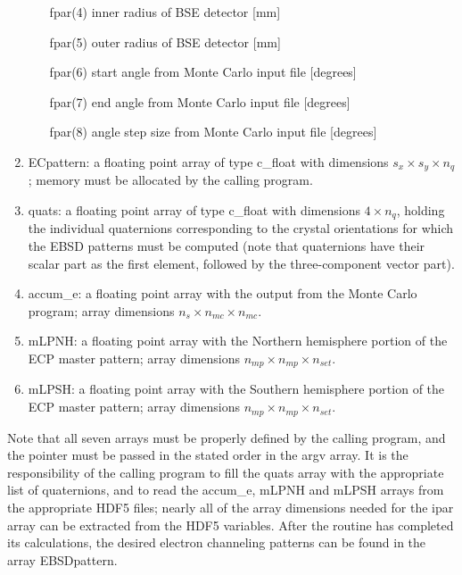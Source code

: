 \documentclass[DIV=calc, paper=letter, fontsize=11pt]{scrartcl}	 %
\begin{document}
\begin{enumerate}
\begin{enumerate}
		\item[\textsf{fpar}(4)] inner radius of BSE detector [mm]
		\item[\textsf{fpar}(5)] outer radius of BSE detector [mm]
		\item[\textsf{fpar}(6)] start angle from Monte Carlo input file [degrees]
		\item[\textsf{fpar}(7)] end angle from Monte Carlo input file [degrees]
		\item[\textsf{fpar}(8)] angle step size from Monte Carlo input file [degrees]
	\end{enumerate}
	\item \textsf{ECpattern}: a floating point array of type \textsf{c\_float} with dimensions $s_x\times s_y\times n_q$; memory must be allocated by the calling program.
	\item \textsf{quats}: a floating point array of type \textsf{c\_float} with dimensions $4\times n_q$, holding the individual quaternions corresponding to the crystal
	orientations for which the EBSD patterns must be computed (note that quaternions have their scalar part as the first element, followed by the three-component vector part).
	\item \textsf{accum\_e}: a floating point array with the output from the Monte Carlo program; array dimensions $n_{s}\times n_{mc}\times n_{mc}$.
	\item \textsf{mLPNH}: a floating point array with the Northern hemisphere portion of the ECP master pattern; array dimensions $n_{mp}\times n_{mp}\times n_{set}$.
	\item \textsf{mLPSH}: a floating point array with the Southern hemisphere portion of the ECP master pattern; array dimensions $n_{mp}\times n_{mp}\times n_{set}$.
\end{enumerate}
Note that all seven arrays must be properly defined by the calling program, and the pointer must be passed in the stated order in the \textsf{argv} array.   It is 
the responsibility of the calling program to fill the \textsf{quats} array with the appropriate list of quaternions, and to read the \textsf{accum\_e}, \textsf{mLPNH} and
\textsf{mLPSH} arrays from the appropriate HDF5 files; nearly all of the array dimensions needed for the \textsf{ipar} array can be
extracted from the HDF5 variables.  After the routine has completed its calculations, the desired electron channeling patterns can be found in the array \textsf{EBSDpattern}.
\end{document}

